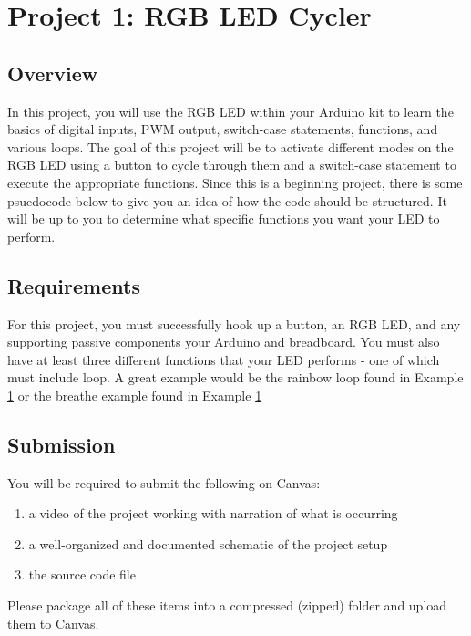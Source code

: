 %

\chapter{Project 1: RGB LED Cycler}

\section*{Overview}
In this project, you will use the RGB LED within your Arduino kit to learn the basics of digital inputs, PWM output, switch-case statements, functions, and various loops.
The goal of this project will be to activate different modes on the RGB LED using a button to cycle through them and a switch-case statement to execute the appropriate functions.
Since this is a beginning project, there is some psuedocode below to give you an idea of how the code should be structured.
It will be up to you to determine what specific functions you want your LED to perform.

\section*{Requirements}
For this project, you must successfully hook up a button, an RGB LED, and any supporting passive components your Arduino and breadboard.
You must also have at least three different functions that your LED performs - one of which must include loop. A great example would be the rainbow loop found in Example \ref{} or the breathe example found in Example \ref{} 

\section*{Submission}
You will be required to submit the following on Canvas:
\begin{enumerate}
    \item a video of the project working with narration of what is occurring
    \item a well-organized and documented schematic of the project setup
    \item the source code file
\end{enumerate}
Please package all of these items into a compressed (zipped) folder and upload them to Canvas.

